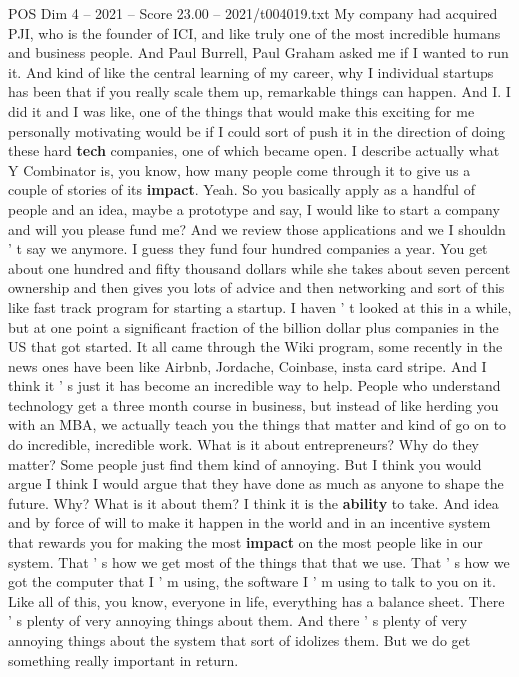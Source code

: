 \begin{textsample}{POS Dim 4 – 2021 – Score 23.00 – 2021/t004019.txt}
My company had acquired PJI, who is the founder of ICI, and like truly one of the most incredible humans and business people.
And Paul Burrell, Paul Graham asked me if I wanted to run it.
And kind of like the central learning of my career, why I individual startups has been that if you really scale them up, remarkable things can happen.
And I.
I did it and I was like, one of the things that would make this exciting for me personally motivating would be if I could sort of push it in the direction of doing these hard \textbf{tech} companies, one of which became open.
I describe actually what Y Combinator is, you know, how many people come through it to give us a couple of stories of its \textbf{impact}.
Yeah.
So you basically apply as a handful of people and an idea, maybe a prototype and say, I would like to start a company and will you please fund me?
And we review those applications and we I shouldn ' t say we anymore.
I guess they fund four hundred companies a year.
You get about one hundred and fifty thousand dollars while she takes about seven percent ownership and then gives you lots of advice and then networking and sort of this like fast track program for starting a startup.
I haven ' t looked at this in a while, but at one point a significant fraction of the billion dollar plus companies in the US that got started.
It all came through the Wiki program, some recently in the news ones have been like Airbnb, Jordache, Coinbase, insta card stripe.
And I think it ' s just it has become an incredible way to help.
People who understand technology get a three month course in business, but instead of like herding you with an MBA, we actually teach you the things that matter and kind of go on to do incredible, incredible work.
What is it about entrepreneurs?
Why do they matter?
Some people just find them kind of annoying.
But I think you would argue I think I would argue that they have done as much as anyone to shape the future.
Why?
What is it about them?
I think it is the \textbf{ability} to take.
And idea and by force of will to make it happen in the world and in an incentive system that rewards you for making the most \textbf{impact} on the most people like in our system.
That ' s how we get most of the things that that we use.
That ' s how we got the computer that I ' m using, the software I ' m using to talk to you on it.
Like all of this, you know, everyone in life, everything has a balance sheet.
There ' s plenty of very annoying things about them.
And there ' s plenty of very annoying things about the system that sort of idolizes them.
But we do get something really important in return.

\end{textsample}
